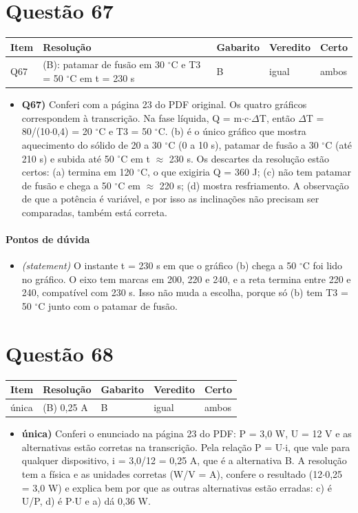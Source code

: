 \documentclass{article}%
\begin{document}
\section*{Questão 67}%
\begin{longtable}{@{}p{} p{} p{} p{} p{}@{}}\toprule Item & Resolução & Gabarito & Veredito & Certo \\ \midrule
Q67 & (B): patamar de fusão em 30 $^\circ$C e T3 = 50 $^\circ$C em t = 230 s & B & igual & ambos \\
\bottomrule\end{longtable}%
\begin{itemize}%
\item%
\textbf{Q67)} Conferi com a página 23 do PDF original. Os quatro gráficos correspondem à transcrição. Na fase líquida, Q = m$\cdot$c$\cdot$$\Delta$T, então $\Delta$T = 80/(10$\cdot$0,4) = 20 $^\circ$C e T3 = 50 $^\circ$C. (b) é o único gráfico que mostra aquecimento do sólido de 20 a 30 $^\circ$C (0 a 10 s), patamar de fusão a 30 $^\circ$C (até 210 s) e subida até 50 $^\circ$C em t $\approx$ 230 s. Os descartes da resolução estão certos: (a) termina em 120 $^\circ$C, o que exigiria Q = 360 J; (c) não tem patamar de fusão e chega a 50 $^\circ$C em $\approx$ 220 s; (d) mostra resfriamento. A observação de que a potência é variável, e por isso as inclinações não precisam ser comparadas, também está correta.%
\end{itemize}%
\paragraph{Pontos de dúvida}%
\begin{itemize}%
\item%
\textit{(statement)} O instante t = 230 s em que o gráfico (b) chega a 50 $^\circ$C foi lido no gráfico. O eixo tem marcas em 200, 220 e 240, e a reta termina entre 220 e 240, compatível com 230 s. Isso não muda a escolha, porque só (b) tem T3 = 50 $^\circ$C junto com o patamar de fusão.%
\end{itemize}%
\section*{Questão 68}%
\begin{longtable}{@{}p{} p{} p{} p{} p{}@{}}\toprule Item & Resolução & Gabarito & Veredito & Certo \\ \midrule
única & (B) 0,25 A & B & igual & ambos \\
\bottomrule\end{longtable}%
\begin{itemize}%
\item%
\textbf{única)} Conferi o enunciado na página 23 do PDF: P = 3,0 W, U = 12 V e as alternativas estão corretas na transcrição. Pela relação P = U$\cdot$i, que vale para qualquer dispositivo, i = 3,0/12 = 0,25 A, que é a alternativa B. A resolução tem a física e as unidades corretas (W/V = A), confere o resultado (12$\cdot$0,25 = 3,0 W) e explica bem por que as outras alternativas estão erradas: c) é U/P, d) é P$\cdot$U e a) dá 0,36 W.%
\end{itemize}%
\end{document}
